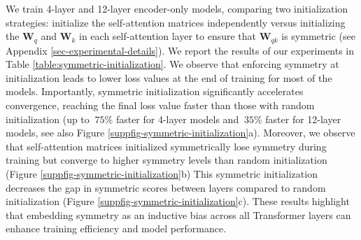 We train 4-layer and 12-layer encoder-only models, comparing two initialization strategies: initialize the self-attention matrices independently versus initializing the $\bm{W}_q$ and $\bm{W}_k$ in each self-attention layer to ensure that $\bm{W}_{qk}$ is symmetric (see Appendix \ref{sec-experimental-details}).
%
We report the results of our experiments in Table \ref{table:symmetric-initialization}.
%
We observe that enforcing symmetry at initialization leads to lower loss values at the end of training for most of the models.
%
Importantly, symmetric initialization significantly accelerates convergence, reaching the final loss value faster than those with random initialization (up to $~75\%$ faster for 4-layer models and $~35\%$ faster for 12-layer models, see also Figure \ref{suppfig-symmetric-initialization}a).
%
Moreover, we observe that self-attention matrices initialized symmetrically lose symmetry during training but converge to higher symmetry levels than random initialization (Figure \ref{suppfig-symmetric-initialization}b)
%
This symmetric initialization decreases the gap in symmetric scores between layers compared to random initialization (Figure \ref{suppfig-symmetric-initialization}c).
%
%
These results highlight that embedding symmetry as an inductive bias across all Transformer layers can enhance training efficiency and model performance.
%